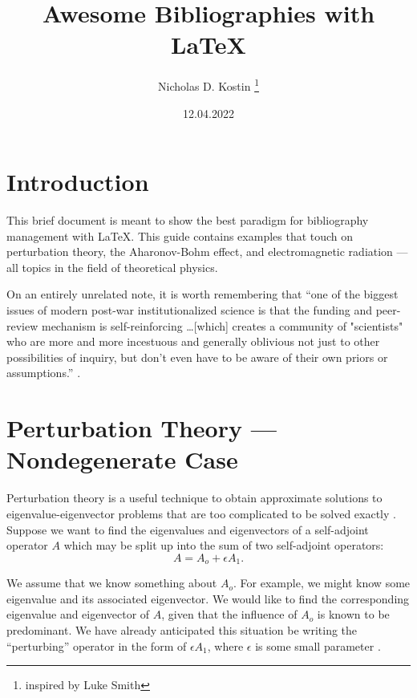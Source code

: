 \documentclass{article}
\title{Awesome Bibliographies with {\LaTeX}}
\author{Nicholas D. Kostin \thanks{inspired by Luke Smith}}
\date{12.04.2022}
\numberwithin{equation}{section}
\begin{document}
\begin{titlepage}
\maketitle
\end{titlepage}


\section{Introduction}

This brief document is meant to show the best paradigm for bibliography management with {\LaTeX}. This guide contains examples that touch on perturbation theory, the Aharonov-Bohm effect, and electromagnetic radiation --- all topics in the field of theoretical physics.

\vspace{1em}

On an entirely unrelated note, it is worth remembering that ``one of the biggest issues of modern post-war institutionalized science is that the funding and peer-review mechanism is self-reinforcing \ldots [which] creates a community of "scientists" who are more and more incestuous and generally oblivious not just to other possibilities of inquiry, but don't even have to be aware of their own priors or assumptions.'' \cite{fragile}. 

\section{Perturbation Theory --- Nondegenerate Case}

Perturbation theory is a useful technique to obtain approximate solutions to eigenvalue-eigenvector problems that are too complicated to be solved exactly \cite{byronfuller}. Suppose we want to find the eigenvalues and eigenvectors of a self-adjoint operator $A$ which may be split up into the sum of two self-adjoint operators:
\begin{equation*}
    A = A_o + \epsilon A_1.
\end{equation*}

We assume that we know something about $A_o$. For example, we might know some eigenvalue and its associated eigenvector. We would like to find the corresponding eigenvalue and eigenvector of $A$, given that the influence of $A_o$ is known to be predominant. We have already anticipated this situation be writing the ``perturbing'' operator in the form of $\epsilon A_1$, where $\epsilon$ is some small parameter \cite{byronfuller}.
\end{document}
